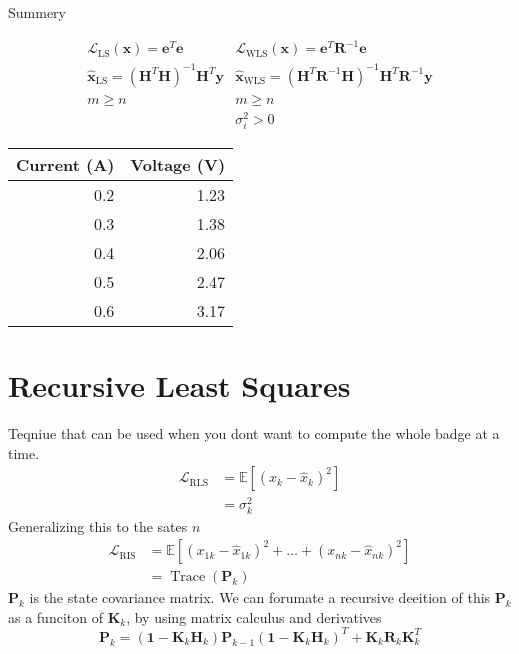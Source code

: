 \documentclass[a4paper]{article}
\begin{document}
Summery

$$\begin{array}{cc}
{\mathscr{L}_{\mathrm{LS}}(\mathbf{x})=\mathbf{e}^{T} \mathbf{e}} & 
{\mathscr{L}_{\mathrm{WLS}}(\mathbf{x})=\mathbf{e}^{T} \mathbf{R}^{-1} \mathbf{e}} \\
 {\hat{\mathbf{x}}_{\mathrm{LS}}=\left(\mathbf{H}^{T} \mathbf{H}\right)^{-1} \mathbf{H}^{T} \mathbf{y}} 
& {\hat{\mathbf{x}}_{\mathrm{WLS}}=\left(\mathbf{H}^{T} \mathbf{R}^{-1} \mathbf{H}\right)^{-1} \mathbf{H}^{T} 
\mathbf{R}^{-1} \mathbf{y}} \\ {m \geq n} & {m \geq n} \\ {} & {\sigma_{i}^{2}>0}
\end{array}$$

\begin{center}
\begin{tabular}{rr}
Current (A) & Voltage (V)\\
\hline
0.2 & 1.23\\
0.3 & 1.38\\
0.4 & 2.06\\
0.5 & 2.47\\
0.6 & 3.17\\
\end{tabular}
\end{center}


\newpage

\section{Recursive Least Squares}
\label{sec-3}

Teqniue that can be used when you dont want to compute the whole badge
at a time.
$$\begin{aligned} \mathscr{L}_{\mathrm{RLS}} &=\mathbb{E}\left[\left(x_{k}-\hat{x}_{k}\right)^{2}\right] \\ &=\sigma_{k}^{2} \end{aligned}$$
Generalizing this to the sates $n$
$$\begin{aligned} \mathscr{L}_{\mathrm{RIS}} &=\mathbb{E}\left[\left(x_{1 k}-\hat{x}_{1 k}\right)^{2}+\ldots+\left(x_{n k}-\hat{x}_{n k}\right)^{2}\right] \\ &=\operatorname{Trace}\left(\mathbf{P}_{k}\right) \end{aligned}$$
$\mathbf{P}_{k}$ is the state covariance matrix. We can forumate a
recursive deeition of this $\mathbf{P}_{k}$ as a funciton of
$\mathbf{K}_{k}$, by using matrix calculus and derivatives
$$\mathbf{P}_{k}=\left(\mathbf{1}-\mathbf{K}_{k} \mathbf{H}_{k}\right) \mathbf{P}_{k-1}\left(\mathbf{1}-\mathbf{K}_{k} \mathbf{H}_{k}\right)^{T}+\mathbf{K}_{k} \mathbf{R}_{k} \mathbf{K}_{k}^{T}$$
\end{document}
